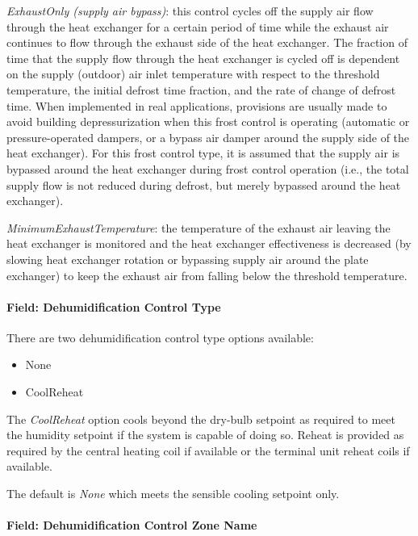 \emph{ExhaustOnly (supply air bypass)}: this control cycles off the supply air flow through the heat exchanger for a certain period of time while the exhaust air continues to flow through the exhaust side of the heat exchanger. The fraction of time that the supply flow through the heat exchanger is cycled off is dependent on the supply (outdoor) air inlet temperature with respect to the threshold temperature, the initial defrost time fraction, and the rate of change of defrost time. When implemented in real applications, provisions are usually made to avoid building depressurization when this frost control is operating (automatic or pressure-operated dampers, or a bypass air damper around the supply side of the heat exchanger). For this frost control type, it is assumed that the supply air is bypassed around the heat exchanger during frost control operation (i.e., the total supply flow is not reduced during defrost, but merely bypassed around the heat exchanger).

\emph{MinimumExhaustTemperature}: the temperature of the exhaust air leaving the heat exchanger is monitored and the heat exchanger effectiveness is decreased (by slowing heat exchanger rotation or bypassing supply air around the plate exchanger) to keep the exhaust air from falling below the threshold temperature.

\paragraph{Field: Dehumidification Control Type}\label{field-dehumidification-control-type-5}

There are two dehumidification control type options available:

\begin{itemize}
\item
  None
\item
  CoolReheat
\end{itemize}

The \emph{CoolReheat} option cools beyond the dry-bulb setpoint as required to meet the humidity setpoint if the system is capable of doing so. Reheat is provided as required by the central heating coil if available or the terminal unit reheat coils if available.

The default is \emph{None} which meets the sensible cooling setpoint only.

\paragraph{Field: Dehumidification Control Zone Name}\label{field-dehumidification-control-zone-name-4}

